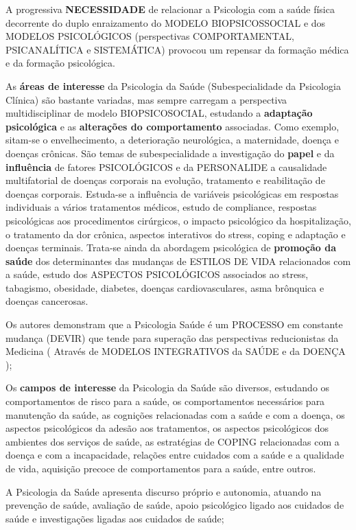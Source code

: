 \documentclass[
]{book}
\begin{document}
A progressiva \textbf{NECESSIDADE} de relacionar a Psicologia com a
saúde física decorrente do duplo enraizamento do MODELO BIOPSICOSSOCIAL
e dos MODELOS PSICOLÓGICOS (perspectivas COMPORTAMENTAL, PSICANALÍTICA e
SISTEMÁTICA) provocou um repensar da formação médica e da formação
psicológica.

As \textbf{áreas de interesse} da Psicologia da Saúde (Subespecialidade
da Psicologia Clínica) são bastante variadas, mas sempre carregam a
perspectiva multidisciplinar de modelo BIOPSICOSOCIAL, estudando a
\textbf{adaptação psicológica} e as \textbf{alterações do comportamento}
associadas. Como exemplo, sitam-se o envelhecimento, a deterioração
neurológica, a maternidade, doença e doenças crônicas. São temas de
subespecialidade a investigação do \textbf{papel} e da
\textbf{influência} de fatores PSICOLÓGICOS e da PERSONALIDE a
causalidade multifatorial de doenças corporais na evolução, tratamento e
reabilitação de doenças corporais. Estuda-se a influência de variáveis
psicológicas em respostas individuais a vários tratamentos médicos,
estudo de compliance, respostas psicológicas aos procedimentos
cirúrgicos, o impacto psicológico da hospitalização, o tratamento da dor
crônica, aspectos interativos do stress, coping e adaptação e doenças
terminais. Trata-se ainda da abordagem psicológica de \textbf{promoção
da saúde} dos determinantes das mudanças de ESTILOS DE VIDA relacionados
com a saúde, estudo dos ASPECTOS PSICOLÓGICOS associados ao stress,
tabagismo, obesidade, diabetes, doenças cardiovasculares, asma brônquica
e doenças cancerosas.

Os autores demonstram que a Psicologia Saúde é um PROCESSO em constante
mudança (DEVIR) que tende para superação das perspectivas reducionistas
da Medicina ( Através de MODELOS INTEGRATIVOS da SAÚDE e da DOENÇA );

Os \textbf{campos de interesse} da Psicologia da Saúde são diversos,
estudando os comportamentos de risco para a saúde, os comportamentos
necessários para manutenção da saúde, as cognições relacionadas com a
saúde e com a doença, os aspectos psicológicos da adesão aos
tratamentos, os aspectos psicológicos dos ambientes dos serviços de
saúde, as estratégias de COPING relacionadas com a doença e com a
incapacidade, relações entre cuidados com a saúde e a qualidade de vida,
aquisição precoce de comportamentos para a saúde, entre outros.

A Psicologia da Saúde apresenta discurso próprio e autonomia, atuando na
prevenção de saúde, avaliação de saúde, apoio psicológico ligado aos
cuidados de saúde e investigações ligadas aos cuidados de saúde;
\end{document}
